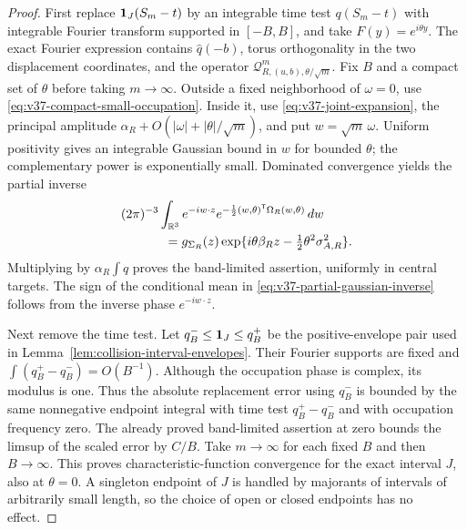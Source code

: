 \begin{proof}
First replace $\mathbf1_J(S_m-t)$ by an integrable time test $q(S_m-t)$
with integrable Fourier transform supported in $[-B,B]$, and take
$F(y)=e^{i\theta y}$. The exact Fourier expression contains
$\widehat q(-b)$, torus orthogonality in the two displacement
coordinates, and the operator
$\mathcal Q_{R,(u,b),\theta/\sqrt m}^m$. Fix $B$ and a compact set of
$\theta$ before taking $m\to\infty$.
Outside a fixed neighborhood of $\omega=0$, use
\eqref{eq:v37-compact-small-occupation}. Inside it, use
\eqref{eq:v37-joint-expansion}, the principal amplitude
$\alpha_R+O(|\omega|+|\theta|/\sqrt m)$, and put $w=\sqrt m\,\omega$.
Uniform positivity gives an integrable Gaussian bound in $w$ for
bounded $\theta$; the complementary power is exponentially small.
Dominated convergence yields the partial inverse
\begin{align}\label{eq:v37-partial-gaussian-inverse}
 &(2\pi)^{-3}\int_{\R^3}e^{-iw\cdot z}
        e^{-\frac12(w,\theta)^{\mathsf T}\Omega_R(w,\theta)}\,dw\notag\\
 &\hspace{12mm}=g_{\Sigma_R}(z)
       \exp\{i\theta\beta_Rz-\tfrac12\theta^2\sigma_{A,R}^2\}.
\end{align}
Multiplying by $\alpha_R\int q$ proves the band-limited assertion,
uniformly in central targets. The sign of the conditional mean in
\eqref{eq:v37-partial-gaussian-inverse} follows from the inverse phase
$e^{-iw\cdot z}$.

Next remove the time test. Let $q_B^-\le\mathbf1_J\le q_B^+$ be the
positive-envelope pair used in Lemma~\ref{lem:collision-interval-envelopes}.
Their Fourier supports are fixed and
$\int(q_B^+-q_B^-)=O(B^{-1})$. Although the occupation phase is
complex, its modulus is one. Thus the absolute replacement error
using $q_B^-$ is bounded by the same nonnegative endpoint integral
with time test $q_B^+-q_B^-$ and with occupation frequency zero.
The already proved band-limited assertion at zero bounds the limsup
of the scaled error by $C/B$. Take $m\to\infty$ for each fixed $B$
and then $B\to\infty$. This proves characteristic-function convergence
for the exact interval $J$, also at $\theta=0$. A singleton endpoint
of $J$ is handled by majorants of intervals of arbitrarily small
length, so the choice of open or closed endpoints has no effect.


\end{proof}

